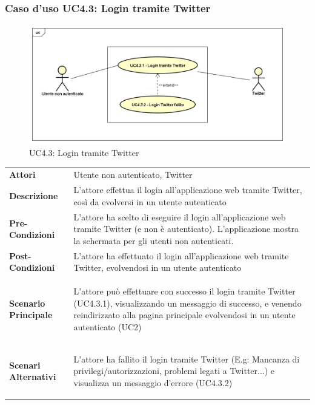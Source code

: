 \newpage
\subsubsection{Caso d'uso UC4.3: Login tramite Twitter }
\label{UC4_3}
\begin{figure}[!htbp]
	\centering
	\includegraphics[scale=0.45]{UML/UC4_3.png}
	\caption{UC4.3: Login tramite Twitter}
\end{figure}

\begin{tabular}{ l | p{11cm}}
	\hline
	\rowcolor{Gray}
	\multicolumn{2}{c}{UC4.3 - Login tramite Twitter} \\
	\hline
	\textbf{Attori} & Utente non autenticato, Twitter \\
	\textbf{Descrizione} & L'attore effettua il login all'applicazione web tramite Twitter, così da evolversi in un utente autenticato \\
	\textbf{Pre-Condizioni} & L'attore ha scelto di eseguire il login all'applicazione web tramite Twitter (e non è autenticato). L'applicazione mostra la schermata per gli utenti non autenticati.\\
	\textbf{Post-Condizioni} & L'attore ha effettuato il login all'applicazione web tramite Twitter, evolvendosi in un utente autenticato \\
	\textbf{Scenario Principale} & 
	\begin{enumerate*}[label=(\arabic*.),itemjoin={\newline}]
		\item L'attore può effettuare con successo il login tramite Twitter (UC4.3.1), visualizzando un messaggio di successo, e venendo reindirizzato alla pagina principale evolvendosi in un utente autenticato (UC2)
	\end{enumerate*}\\
	\textbf{Scenari Alternativi} & 
	\begin{enumerate*}[label=(\arabic*.),itemjoin={\newline}]
	\item L'attore ha fallito il login tramite Twitter (E.g: Mancanza di privilegi/autorizzazioni, problemi legati a Twitter...) e visualizza un messaggio d'errore (UC4.3.2)
	\end{enumerate*}\\
\end{tabular}